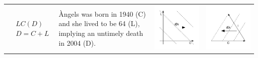 \documentclass[12pt,oneside,letter]{article} %
\begin{document}
\begin{center}
\begin{longtable}{m{}m{}m{}m{}}
  \midrule
  $$\begin{aligned}
    &LC(D) \\
    &D = C + L
  \end{aligned}$$ &
  {\`A}ngels was born in 1940 (C) and she lived to be 64 (L), implying an
  untimely death in 2004 (D). & \includegraphics[width =
  \linewidth]{Figures/JonasTable/LCd.pdf} & \includegraphics[width = \linewidth]{Figures/JonasTable/LCd_iso.pdf}  \\

\end{longtable}
\end{center}
\end{document}
